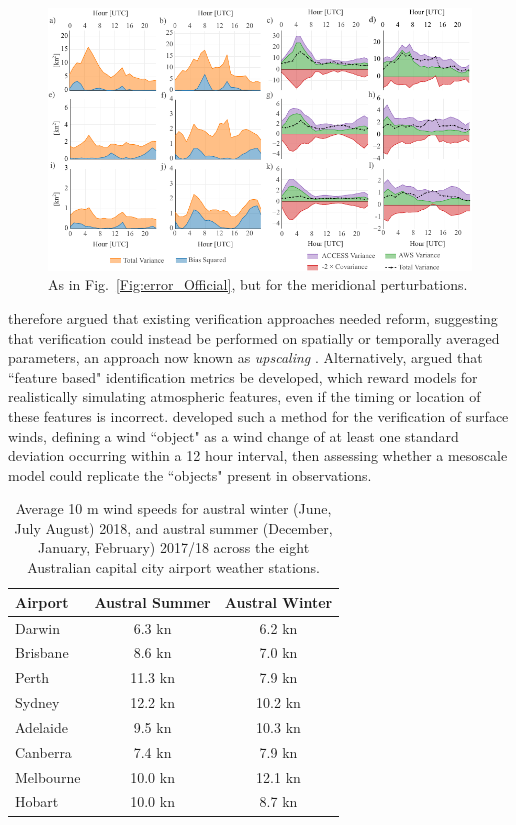 \documentclass[twocol]{ametsoc}
\begin{document}
\begin{figure}
\centering
\includegraphics[width=39pc]{error_ACCESS.pdf}
\caption{As in Fig.~\ref{Fig:error_Official}, but for the meridional perturbations.}
\label{Fig:error_ACCESS}
\end{figure}

\citet{mass02} therefore argued that existing verification approaches needed reform, suggesting that verification could instead be performed on spatially or temporally averaged parameters, an approach now known as \textit{upscaling} \citep{ebert08}. Alternatively, \citet{mass02} argued that ``feature based" identification metrics be developed, which reward models for realistically simulating atmospheric features, even if the timing or location of these features is incorrect. \citet{rife05} developed such a method for the verification of surface winds, defining a wind ``object" as a wind change of at least one standard deviation occurring within a 12 hour interval, then assessing whether a mesoscale model could replicate the ``objects" present in observations.

\begin{table}
\begin{center}
\begin{tabular}{l |c|c}
Airport & Austral Summer & Austral Winter \\
\hline
Darwin  & 6.3 kn& 6.2 kn \\
Brisbane  & 8.6 kn& 7.0 kn \\
Perth  & 11.3 kn& 7.9 kn \\
Sydney  & 12.2 kn & 10.2 kn \\
Adelaide  & 9.5 kn & 10.3 kn \\
Canberra  & 7.4 kn & 7.9 kn \\
Melbourne  & 10.0 kn & 12.1 kn \\
Hobart & 10.0 kn & 8.7 kn
\end{tabular}
\caption{Average 10 m wind speeds for austral winter (June, July August) 2018, and austral summer (December, January, February) 2017/18 across the eight Australian capital city airport weather stations.}
\label{Tab:Speeds}
\end{center}
\end{table}
\end{document}
